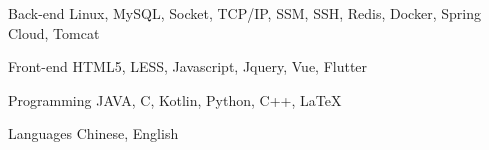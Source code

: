 

\begin{cvskills}

  \cvskill
    {Back-end} %
    {Linux, MySQL, Socket, TCP/IP, SSM, SSH, Redis, Docker, Spring Cloud, Tomcat} %

  \cvskill
    {Front-end} %
    {HTML5, LESS, Javascript, Jquery, Vue, Flutter} %

  \cvskill
    {Programming} %
    {JAVA, C, Kotlin, Python, C++, LaTeX} %

  \cvskill
    {Languages} %
    {Chinese, English} %

\end{cvskills}
